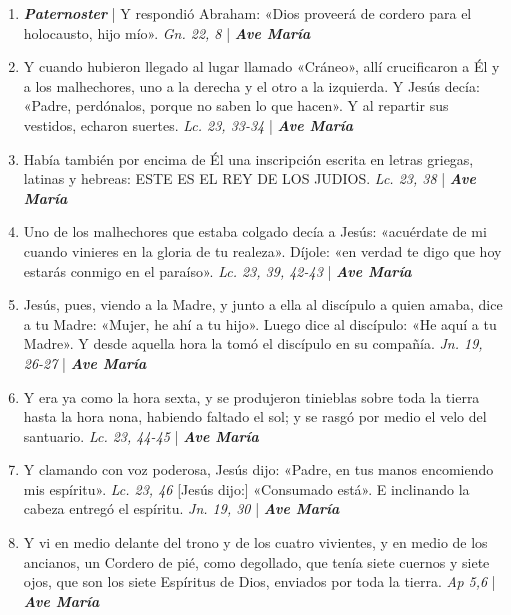 \documentclass[../../devocionario.tex]{subfiles}
\begin{document}
    \begin{enumerate}
    
        \item \textbf{\textit{Paternoster}} | Y respondió Abraham: «Dios proveerá de cordero para el holocausto, hijo mío». \textit{Gn. 22, 8} | \textbf{\textit{Ave María}}

        \item Y cuando hubieron llegado al lugar llamado «Cráneo», allí crucificaron a Él y a los malhechores, 
            uno a la derecha y el otro a la izquierda. Y Jesús decía: «Padre, perdónalos, porque no saben lo que hacen». 
            Y al repartir sus vestidos, echaron suertes. \textit{Lc. 23, 33-34} | \textbf{\textit{Ave María}}

        \item Había también por encima de Él una inscripción escrita en letras griegas, latinas y hebreas: 
            ESTE ES EL REY DE LOS JUDIOS. \textit{Lc. 23, 38} | \textbf{\textit{Ave María}}

        \item Uno de los malhechores que estaba colgado decía a Jesús: «acuérdate de mi cuando vinieres en la gloria de tu realeza». 
            Díjole: «en verdad te digo que hoy estarás conmigo en el paraíso». \textit{Lc. 23, 39, 42-43} | \textbf{\textit{Ave María}}

        \item Jesús, pues, viendo a la Madre, y junto a ella al discípulo a quien amaba, dice a tu Madre: 
            «Mujer, he ahí a tu hijo». Luego dice al discípulo: «He aquí a tu Madre». 
            Y desde aquella hora la tomó el discípulo en su compañía. \textit{Jn. 19, 26-27} | \textbf{\textit{Ave María}}

        \item Y era ya como la hora sexta, y se produjeron tinieblas sobre toda la tierra hasta la hora nona, 
            habiendo faltado el sol; y se rasgó por medio el velo del santuario. \textit{Lc. 23, 44-45} | \textbf{\textit{Ave María}}

        \item Y clamando con voz poderosa, Jesús dijo: «Padre, en tus manos encomiendo mis espíritu». \textit{Lc. 23, 46} 
            [Jesús dijo:] «Consumado está». E inclinando la cabeza entregó el espíritu. \textit{Jn. 19, 30} | \textbf{\textit{Ave María}}

        \item Y vi en medio delante del trono y de los cuatro vivientes, y en medio de los ancianos, 
            un Cordero de pié, como degollado, que tenía siete cuernos y siete ojos, que son los siete Espíritus de Dios, 
            enviados por toda la tierra. \textit{Ap 5,6} | \textbf{\textit{Ave María}}


\end{enumerate}
\end{document}
